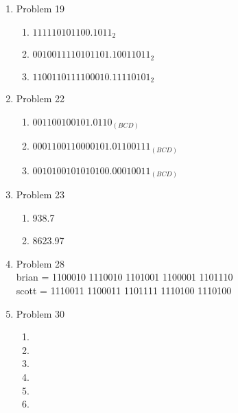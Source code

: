 \begin{enumerate}[leftmargin=2cm,labelsep=.5cm,label=\bf\arabic*.]
\item Problem 19
\begin{enumerate}
  \item $111110101100.1011_2$
  \item $0010011110101101.10011011_2$
  \item $1100110111100010.11110101_2$
\end{enumerate}

\item Problem 22
\begin{enumerate}
  \item $001100100101.0110_{(BCD)}$
  \item $0001100110000101.01100111_{(BCD)}$
  \item $0010100101010100.00010011_{(BCD)}$
\end{enumerate}

\item Problem 23
\begin{enumerate}
  \item 938.7
  \item 8623.97
\end{enumerate}

\item Problem 28\\
brian = 1100010 1110010 1101001 1100001 1101110\\
scott = 1110011 1100011 1101111 1110100 1110100\\

\item Problem 30
\begin{enumerate}
  \item
  \item
  \item
  \item
  \item
  \item
\end{enumerate}

\end{enumerate}